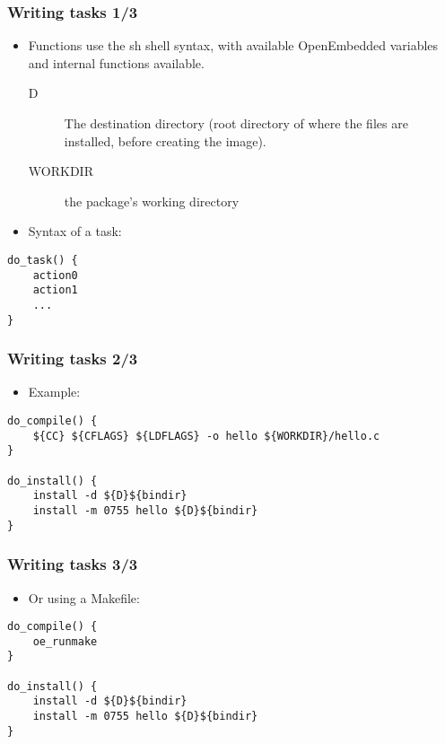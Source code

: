 \begin{frame}[fragile]
  \frametitle{Writing tasks 1/3}
  \begin{itemize}
    \item Functions use the sh shell syntax, with available
      OpenEmbedded variables and internal functions available.
      \begin{description}
        \item[D] The destination directory (root directory of where
          the files are installed, before creating the image).
        \item[WORKDIR] the package's working directory
      \end{description}
    \item Syntax of a task:
  \end{itemize}
  \begin{block}{}
    \begin{verbatim}
do_task() {
    action0
    action1
    ...
}
    \end{verbatim}
  \end{block}
\end{frame}

\begin{frame}[fragile]
  \frametitle{Writing tasks 2/3}
  \begin{itemize}
    \item Example:
  \end{itemize}
  \begin{block}{}
    \begin{verbatim}
do_compile() {
    ${CC} ${CFLAGS} ${LDFLAGS} -o hello ${WORKDIR}/hello.c
}

do_install() {
    install -d ${D}${bindir}
    install -m 0755 hello ${D}${bindir}
}
    \end{verbatim}
  \end{block}
\end{frame}

\begin{frame}[fragile]
  \frametitle{Writing tasks 3/3}
  \begin{itemize}
    \item Or using a Makefile:
  \end{itemize}
  \begin{block}{}
    \begin{verbatim}
do_compile() {
    oe_runmake
}

do_install() {
    install -d ${D}${bindir}
    install -m 0755 hello ${D}${bindir}
}
    \end{verbatim}
  \end{block}
\end{frame}

